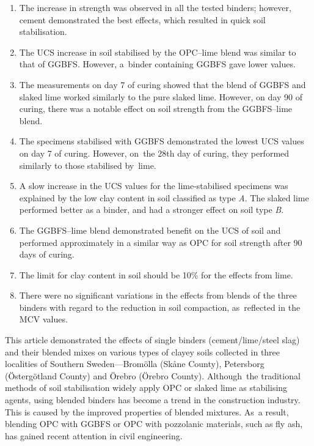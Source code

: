 \documentclass[electronics,article,accept,pdftex,moreauthors]{Definitions/mdpi}
\begin{document}
\begin{enumerate}
   \item The {increase in} strength was {observed in all} the tested binders{; however, cement demonstrated the best }effects{, }which {resulted in }quick soil stabilisation.
   \item The UCS increase in soil stabilised by {the} OPC--lime blend was similar to that of GGBFS. However, a~binder containing GGBFS gave lower values.  
   \item The measurements on day 7 of curing showed that the {blend} of GGBFS and slaked lime {worked} similarly to the pure slaked lime. However, {on day 90 of curing, }there was a notable {effect on} soil strength from the GGBFS--lime blend. 
   \item The specimens stabilised with GGBFS {demonstrated} the lowest UCS {values on day 7} of curing{. }However, on~the 28th day of curing, they performed similarly to those stabilised by~lime.
   \item {A slow} increase in {the} UCS {values} for the lime-stabilised specimens was explained by the low clay content in soil {classified as} type \emph{A}. {The} slaked lime performed better as a binder{, }and had a stronger {effect on} soil type \emph{B}.
   \item The GGBFS--lime blend demonstrated benefit on the UCS of soil and performed approximately in a similar way as OPC for soil strength after 90 days of curing.	
   \item {The} limit for clay content in soil should be{ }10\% {for the effects from lime}.
   \item {There were no} significant variations in {the} effects from {blends of} the three binders with regard to {the} reduction {in} soil compaction, as~reflected in the MCV values{.}
 \end{enumerate}

	This article demonstrated the effects {of} single binders (cement/lime/steel slag) and their blended mixes on various types of clayey soils collected in {three localities of} Southern Sweden{---Brom\"olla (Sk\aa ne County), Petersborg (\"Osterg\"otland County) and \"Orebro (\"Orebro County)}. Although~{the} traditional methods of soil stabilisation widely apply OPC or slaked lime as stabilising agents,{ }using blended binders{ has become a trend in the construction industry}. This is caused by the improved properties of {blended} mixtures. As~a result, blending OPC with GGBFS or OPC with pozzolanic materials, such as fly ash, has gained {recent} attention in civil engineering{. }
	
\end{document}

